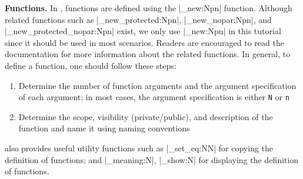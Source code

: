 \documentclass{ltugboat}
\begin{document}
\par\medskip\noindent\textbf{Functions.}
In \LTT{}, functions are defined using the \inltex|\cs_new:Npn| function.
Although related functions such as \inltex|\cs_new_protected:Npn|, \inltex|\cs_new_nopar:Npn|, and \inltex|\cs_new_protected_nopar:Npn| exist, we only use \inltex|\cs_new:Npn| in this tutorial since it should be used in most scenarios. 
Readers are encouraged to read the \LTT{} documentation for more information about the related functions.
In general, to define a function, one should follow these steps:
\begin{enumerate}
    \item Determine the number of function arguments and the argument specification of each argument; in most cases, the argument specification is either \verb|N| or \verb|n|
    \item Determine the scope, visibility (private/public), and description of the function and name it using \LTT{} naming conventions
\end{enumerate}
\LTT{} also provides useful utility functions such as \inltex|\cs_set_eq:NN| for copying the definition of functions; and \inltex|\cs_meaning:N|, \inltex|\cs_show:N| for displaying the definition of functions.





\makesignature
\end{document}
